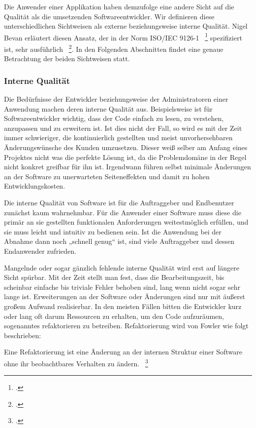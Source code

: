 Die Anwender einer Applikation haben demzufolge eine andere Sicht auf die Qualität als die umsetzenden Softwareentwickler. Wir definieren diese unterschiedlichen Sichtweisen als externe beziehungsweise interne Qualität. Nigel Bevan erläutert diesen Ansatz, der in der Norm ISO/IEC 9126-1 ~\footcite[]{ISOIEC91261} spezifiziert ist, sehr ausführlich ~\footcite[]{Bevan.1999}. In den Folgenden Abschnitten findet eine genaue Betrachtung der beiden Sichtweisen statt.

\subsubsection{Interne Qualität}
Die Bedürfnisse der Entwickler beziehungsweise der Administratoren einer Anwendung machen deren interne Qualität aus. Beispielsweise ist für Softwareentwickler wichtig, dass der Code einfach zu lesen, zu verstehen, anzupassen und zu erweitern ist. Ist dies nicht der Fall, so wird es mit der Zeit immer schwieriger, die kontinuierlich gestellten und meist unvorhersehbaren Änderungswünsche des Kunden umzusetzen. Dieser weiß selber am Anfang eines Projektes nicht was die perfekte Lösung ist, da die Problemdomäne in der Regel nicht konkret greifbar für ihn ist. Irgendwann führen selbst minimale Änderungen an der Software zu unerwarteten Seiteneffekten und damit zu hohen Entwicklungskosten.

Die interne Qualität von Software ist für die Auftraggeber und Endbenutzer zunächst kaum wahrnehmbar. Für die Anwender einer Software muss diese die primär an sie gestellten funktionalen Anforderungen weitestmöglich erfüllen, und sie muss leicht und intuitiv zu bedienen sein. Ist die Anwendung bei der Abnahme dann noch „schnell genug“ ist, sind viele Auftraggeber und dessen Endanwender zufrieden.

Mangelnde oder sogar gänzlich fehlende interne Qualität wird erst auf längere Sicht spürbar. Mit der Zeit stellt man fest, dass die Bearbeitungszeit, bis scheinbar einfache bis triviale Fehler behoben sind, lang wenn nicht sogar sehr lange ist. Erweiterungen an der Software oder Änderungen sind nur mit äußerst großem Aufwand realisierbar. In den meisten Fällen bitten die Entwickler kurz oder lang oft darum Ressourcen zu erhalten, um den Code aufzuräumen, sogenanntes refaktorieren zu betreiben. Refaktorierung wird von Fowler wie folgt beschrieben: 

\dq{}Eine Refaktorierung ist eine Änderung an der internen Struktur einer Software ohne ihr beobachtbares Verhalten zu ändern.\dq{} ~\footcite[Seite xviii]{Fowler.2000}

